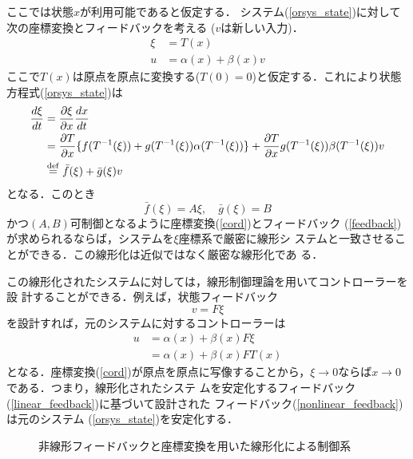 ここでは状態$x$が利用可能であると仮定する．
システム(\ref{orsys_state})に対して次の座標変換とフィードバックを考える
($v$は新しい入力)．
\begin{align}
 \xi &= T(x) \label{cord} \\
 u   &= \alpha (x) + \beta (x) v
  \label{feedback}
\end{align}
ここで$T(x)$は原点を原点に変換する($T(0)=0$)と仮定する．これにより状態
方程式(\ref{orsys_state})は
\begin{align}
 \frac{d \xi}{dt} 
  &= \frac{\partial \xi}{\partial x} \frac{dx}{dt} \nonumber \\
 &= \frac{\partial T}{\partial x} 
  \{ f(T^{-1}(\xi)) + g(T^{-1}(\xi)) \alpha(T^{-1}(\xi)) \}
  + \frac{\partial T}{\partial x} g(T^{-1}(\xi)) \beta (T^{-1}(\xi)) v \\
 &\stackrel{\rm def}{=} \bar{f}(\xi) + \bar{g}(\xi) v
  \label{feed_state}
\end{align}
となる．このとき
\begin{equation}
 \bar{f}(\xi) = A \xi, \quad \bar{g}(\xi) = B 
  \label{linear}
\end{equation}
かつ$(A, B)$可制御となるように座標変換(\ref{cord})とフィードバック
(\ref{feedback})が求められるならば，システムを$\xi$座標系で厳密に線形シ
ステムと一致させることができる．この線形化は近似ではなく厳密な線形化であ
る．

この線形化されたシステムに対しては，線形制御理論を用いてコントローラーを設
計することができる．例えば，状態フィードバック
\begin{equation}
 v = F \xi
  \label{linear_feedback}
\end{equation}
を設計すれば，元のシステムに対するコントローラーは
\begin{align}
 u &= \alpha(x) + \beta(x) F \xi \nonumber \\
   &= \alpha(x) + \beta(x) F T(x)
    \label{nonlinear_feedback}
\end{align}
となる．座標変換(\ref{cord})が原点を原点に写像することから，$\xi
\rightarrow 0$ならば$x \rightarrow 0$である．つまり，線形化されたシステ
ムを安定化するフィードバック(\ref{linear_feedback})に基づいて設計された
フィードバック(\ref{nonlinear_feedback})は元のシステム
(\ref{orsys_state})を安定化する．

\begin{figure}[htbp]
 \begin{center}
  \caption{非線形フィードバックと座標変換を用いた線形化による制御系}
  \label{config_lin_w_fd_cor}
 \end{center}
\end{figure}

